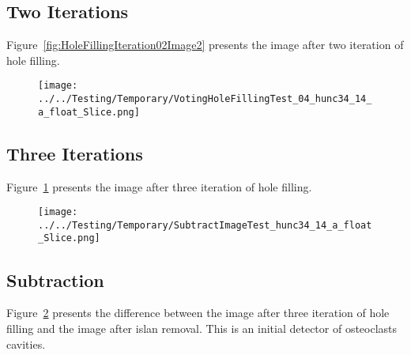 \documentclass{InsightArticle}
\begin{document}
\subsection{Two Iterations}

Figure~\ref{fig:HoleFillingIteration02Image2} presents the image after two iteration of hole filling.



\clearpage
\begin{figure}
\center
\texttt{[image: ../../Testing/Temporary/VotingHoleFillingTest\_04\_hunc34\_14\_a\_float\_Slice.png]}
\label{fig:HoleFillingIteration03Image3}
\end{figure}

\subsection{Three Iterations}

Figure~\ref{fig:HoleFillingIteration03Image3} presents the image after three iteration of hole filling.


\clearpage
\begin{figure}
\center
\texttt{[image: ../../Testing/Temporary/SubtractImageTest\_hunc34\_14\_a\_float\_Slice.png]}
\label{fig:SubtractionImage}
\end{figure}

\subsection{Subtraction}

Figure~\ref{fig:SubtractionImage} presents the difference between the image
after three iteration of hole filling and the image after islan removal. This
is an initial detector of osteoclasts cavities.


%
%



\end{document}
